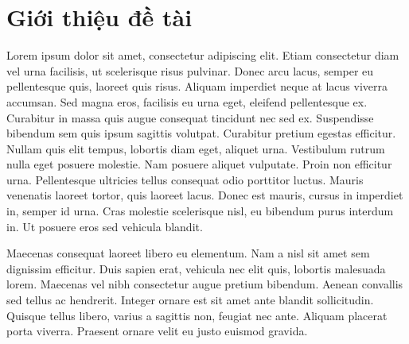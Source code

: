 \section{Giới thiệu đề tài}
Lorem ipsum dolor sit amet, consectetur adipiscing elit. Etiam consectetur diam vel urna facilisis, ut scelerisque risus pulvinar. Donec arcu lacus, semper eu pellentesque quis, laoreet quis risus. Aliquam imperdiet neque at lacus viverra accumsan. Sed magna eros, facilisis eu urna eget, eleifend pellentesque ex. Curabitur in massa quis augue consequat tincidunt nec sed ex. Suspendisse bibendum sem quis ipsum sagittis volutpat. Curabitur pretium egestas efficitur. Nullam quis elit tempus, lobortis diam eget, aliquet urna. Vestibulum rutrum nulla eget posuere molestie. Nam posuere aliquet vulputate. Proin non efficitur urna. Pellentesque ultricies tellus consequat odio porttitor luctus. Mauris venenatis laoreet tortor, quis laoreet lacus. Donec est mauris, cursus in imperdiet in, semper id urna. Cras molestie scelerisque nisl, eu bibendum purus interdum in. Ut posuere eros sed vehicula blandit.

Maecenas consequat laoreet libero eu elementum. Nam a nisl sit amet sem dignissim efficitur. Duis sapien erat, vehicula nec elit quis, lobortis malesuada lorem. Maecenas vel nibh consectetur augue pretium bibendum. Aenean convallis sed tellus ac hendrerit. Integer ornare est sit amet ante blandit sollicitudin. Quisque tellus libero, varius a sagittis non, feugiat nec ante. Aliquam placerat porta viverra. Praesent ornare velit eu justo euismod gravida.

